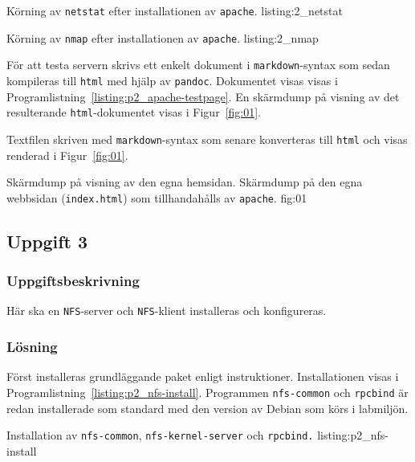             {Körning av \texttt{netstat} efter installationen av \texttt{apache}.}
            {listing:2_netstat}

            {Körning av \texttt{nmap} efter installationen av \texttt{apache}.}
            {listing:2_nmap}


För att testa servern skrivs ett enkelt dokument i
\texttt{markdown}\cite{Gruber2013}-syntax som sedan kompileras till
\texttt{html} med hjälp av \texttt{pandoc}\cite{MacFarlane2013}.
Dokumentet visas visas i Programlistning~\ref{listing:p2_apache-testpage}.
En skärmdump på visning av det resulterande \texttt{html}-dokumentet visas i
Figur~\ref{fig:01}.

\begin{listing}[H]
\caption{Textfilen skriven med \texttt{markdown}-syntax som senare konverteras
         till \texttt{html} och visas renderad i Figur~\ref{fig:01}.}
\label{listing:p2_apache-testpage}
\end{listing}

           {Skärmdump på visning av den egna hemsidan.}
           {Skärmdump på den egna webbsidan (\texttt{index.html}) som
            tillhandahålls av \texttt{apache}.}
           {fig:01}


\subsection{Uppgift 3}
\subsubsection{Uppgiftsbeskrivning}
Här ska en \texttt{NFS}-server och \texttt{NFS}-klient installeras och
konfigureras.


\subsubsection{Lösning}
Först installeras grundläggande paket enligt instruktioner.
Installationen visas i Programlistning~\ref{listing:p2_nfs-install}.
Programmen \texttt{nfs-common} och \texttt{rpcbind} är redan installerade
som standard med den version av Debian som körs i labmiljön.

            {Installation av \texttt{nfs-common}, \texttt{nfs-kernel-server}
             och \texttt{rpcbind.}}
            {listing:p2_nfs-install}



